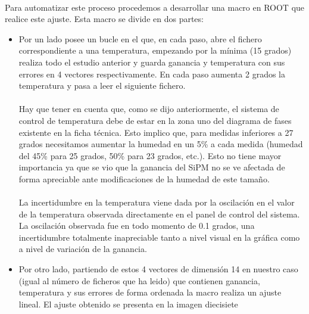 \documentclass[11pt, a4paper]{article}
\begin{document}
\paragraph {}
Para automatizar este proceso procedemos a desarrollar una macro en ROOT que realice este ajuste. Esta macro se divide en dos partes:
\begin{itemize}
\item{} Por un lado posee un bucle en el que, en cada paso, abre el fichero correspondiente a una temperatura, empezando por la mínima (15 grados) realiza todo el estudio anterior y guarda ganancia y temperatura con sus errores en 4 vectores respectivamente. En cada paso aumenta 2 grados la temperatura y pasa a leer el siguiente fichero.

\paragraph {}
Hay que tener en cuenta que, como se dijo anteriormente, el sistema de control de temperatura debe de estar en la zona uno del diagrama de fases existente en la ficha técnica. Esto implico que, para medidas inferiores a 27 grados necesitamos aumentar la humedad en un 5\% a cada medida (humedad del 45\% para 25 grados, 50\% para 23 grados, etc.). Esto no tiene mayor importancia ya que se vio que la ganancia del SiPM no se ve afectada de forma apreciable ante modificaciones de la humedad de este tamaño.

\paragraph {}
La incertidumbre en la temperatura viene dada por la oscilación en el valor de la temperatura observada directamente en el panel de control del sistema. La oscilación observada fue en todo momento de 0.1 grados, una incertidumbre totalmente inapreciable tanto a nivel visual en la gráfica como a nivel de variación de la ganancia.

\item {} Por otro lado, partiendo de estos 4 vectores de dimensión 14 en nuestro caso (igual al número de ficheros que ha leido) que contienen ganancia, temperatura y sus errores de forma ordenada la macro realiza un ajuste lineal. El ajuste obtenido se presenta en la imagen diecisiete


\end{itemize}
\end{document}
